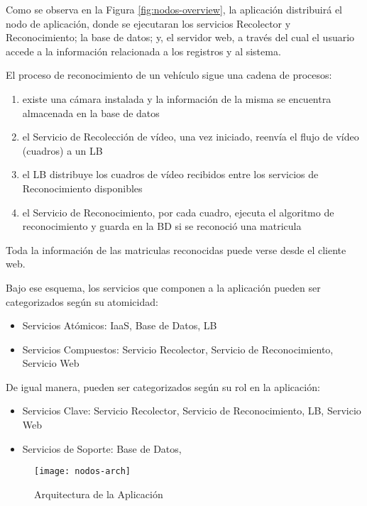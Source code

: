     Como se observa en la Figura \ref{fig:nodos-overview}, la aplicación distribuirá el nodo de aplicación, donde se ejecutaran los servicios Recolector y Reconocimiento; la base de datos; y, el servidor web, a través del cual el usuario accede a la información relacionada a los registros y al sistema.
        
        El proceso de reconocimiento de un vehículo sigue una cadena de procesos:

        \begin{enumerate}
            \item existe una cámara instalada y la información de la misma se encuentra almacenada en la base de datos
            \item el Servicio de Recolección de vídeo, una vez iniciado, reenvía el flujo de vídeo (cuadros) a un LB
            \item el LB distribuye los cuadros de vídeo recibidos entre los servicios de Reconocimiento disponibles
            \item el Servicio de Reconocimiento, por cada cuadro, ejecuta el algoritmo de reconocimiento y guarda en la BD si se reconoció una matricula
        \end{enumerate}    
        
        Toda la información de las matriculas reconocidas puede verse desde el cliente web.
        
        Bajo ese esquema, los servicios que componen a la aplicación pueden ser categorizados según su atomicidad:
        \begin{itemize}
            \item Servicios Atómicos: IaaS, Base de Datos, LB
            \item Servicios Compuestos: Servicio Recolector, Servicio de Reconocimiento, Servicio Web
        \end{itemize}
        De igual manera, pueden ser categorizados según su rol en la aplicación:
        \begin{itemize}
            \item Servicios Clave: Servicio Recolector, Servicio de Reconocimiento, LB, Servicio Web
            \item Servicios de Soporte: Base de Datos,
        \end{itemize}
    
        \begin{figure}[H]
            \centering
            \texttt{[image: nodos-arch]}
            \caption{Arquitectura de la Aplicación}
            \label{fig:nodos-arch}
        \end{figure} 
        
